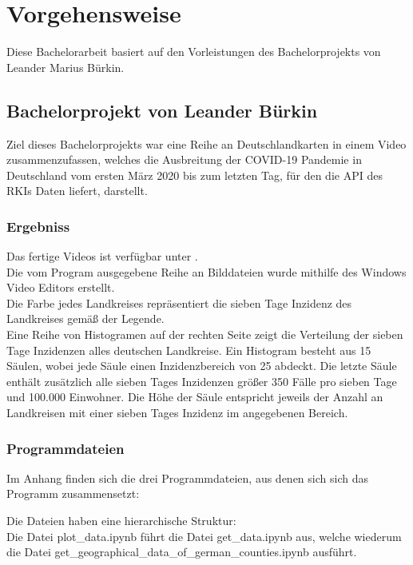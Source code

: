 \chapter{Vorgehensweise}\label{chap:Vorgehensweise}
Diese Bachelorarbeit basiert auf den Vorleistungen des Bachelorprojekts von Leander Marius Bürkin.

\section{Bachelorprojekt von Leander Bürkin}
Ziel dieses Bachelorprojekts war eine Reihe an Deutschlandkarten in einem Video zusammenzufassen, welches die Ausbreitung der COVID-19 Pandemie in Deutschland vom ersten März 2020 bis zum letzten Tag, für den die API des RKIs Daten liefert, darstellt.

\subsection{Ergebniss}
Das fertige Videos ist verfügbar unter .\\
Die vom Program ausgegebene Reihe an Bilddateien wurde mithilfe des Windows Video Editors erstellt.
\\
Die Farbe jedes Landkreises repräsentiert die sieben Tage Inzidenz des Landkreises gemäß der Legende.\\
Eine Reihe von Histogramen auf der rechten Seite zeigt die Verteilung der sieben Tage Inzidenzen alles deutschen Landkreise. Ein Histogram besteht aus 15 Säulen, wobei jede Säule einen Inzidenzbereich von 25 abdeckt. Die letzte Säule enthält zusätzlich alle sieben Tages Inzidenzen größer 350 Fälle pro sieben Tage und 100.000 Einwohner. Die Höhe der Säule entspricht jeweils der Anzahl an Landkreisen mit einer sieben Tages Inzidenz im angegebenen Bereich.

\subsection{Programmdateien}
Im Anhang finden sich die drei Programmdateien, aus denen sich sich das Programm zusammensetzt: 

Die Dateien haben eine hierarchische Struktur:\\
Die Datei \glqq{}plot\_data.ipynb\grqq{} führt die Datei \glqq{}get\_data.ipynb\grqq{} aus,
welche wiederum die Datei \glqq{}get\_geographical\_data\_of\_german\_counties.ipynb\grqq{} ausführt.

